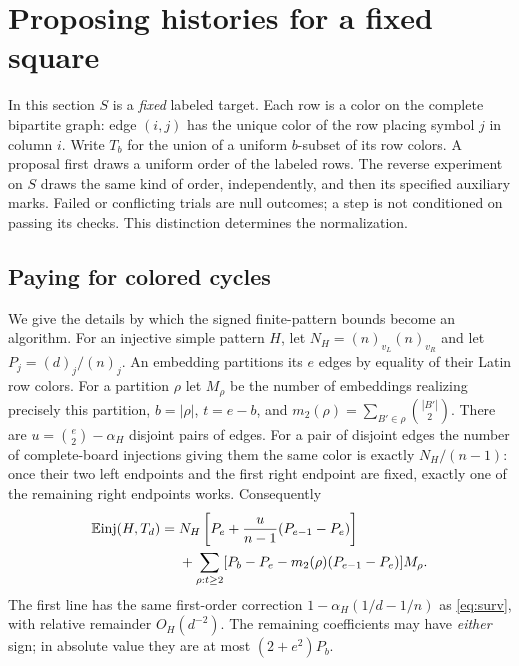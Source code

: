 \section{Proposing histories for a fixed square}\label{sec:coverage}
In this section $S$ is a \emph{fixed} labeled target. Each row is a color on the complete bipartite graph: edge $(i,j)$ has the unique color of the row placing symbol $j$ in column $i$. Write $T_b$ for the union of a uniform $b$-subset of its row colors. A proposal first draws a uniform order of the labeled rows. The reverse experiment on $S$ draws the same kind of order, independently, and then its specified auxiliary marks. Failed or conflicting trials are null outcomes; a step is not conditioned on passing its checks. This distinction determines the normalization.

\subsection{Paying for colored cycles}
We give the details by which the signed finite-pattern bounds become an algorithm. For an injective simple pattern $H$, let $N_H=(n)_{v_L}(n)_{v_R}$ and let $P_j=(d)_j/(n)_j$. An embedding partitions its $e$ edges by equality of their Latin row colors. For a partition $\rho$ let $M_\rho$ be the number of embeddings realizing precisely this partition, $b=|\rho|$, $t=e-b$, and $m_2(\rho)=\sum_{B'\in\rho}\binom{|B'|}{2}$. There are $u=\binom e2-\alpha_H$ disjoint pairs of edges. For a pair of disjoint edges the number of complete-board injections giving them the same color is exactly $N_H/(n-1)$: once their two left endpoints and the first right endpoint are fixed, exactly one of the remaining right endpoints works. Consequently
\begin{align}
\mathbb E\mathrm{inj}(H,T_d)={}&N_H\left[P_e+\frac{u}{n-1}(P_{e-1}-P_e)\right]\nonumber\\
 &+\sum_{\rho:t\ge2}
  [P_b-P_e-m_2(\rho)(P_{e-1}-P_e)]M_\rho.\label{eq:partition}
\end{align}
The first line has the same first-order correction $1-\alpha_H(1/d-1/n)$ as \eqref{eq:surv}, with relative remainder $O_H(d^{-2})$. The remaining coefficients may have \emph{either} sign; in absolute value they are at most $(2+e^2)P_b$.

